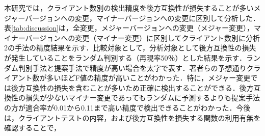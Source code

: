 \documentclass[submit]{ipsj}
\begin{document}
{本研究では，クライアント数別の検出精度を後方互換性が損失することが多いメジャーバージョンへの変更，マイナーバージョンへの変更に区別して分析した．
表\ref{tab:discussion}は，全変更，メジャーバージョンへの変更（メジャー変更），マイナーバージョンへの変更（マイナー変更）に区別してクライアント数別に分析2の手法の精度結果を示す．比較対象として，分析対象として後方互換性の損失が発生していることをランダム判別する（再現率50％）とした結果を示す．ランダム判別手法と提案手法で精度が高い場合を太字で表す．著者らの予想通りクライアント数が多いほどF値の精度が高いことがわかった．特に，メジャー変更では後方互換性の損失を含むことが多いため正確に検出することができる．後方互換性の損失が少ないマイナー変更であってもランダムに予測するよりも提案手法の方が適合率が0.01から0.11まで高い精度で検出できることがわかった．今後は，クライアントテストの内容，および後方互換性を損失する関数の利用有無を確認することで，\textcolor{red}{}

}
\end{document}
